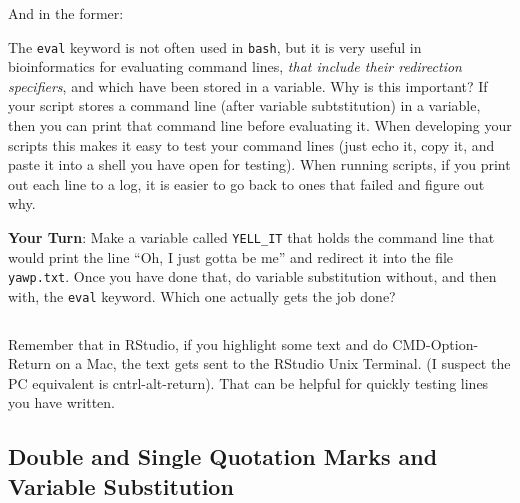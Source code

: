 \documentclass[]{krantz}
\makeatletter
\newenvironment{Shaded}{\begin{snugshade}}{\end{snugshade}}
\newcommand{\BuiltInTok}[1]{#1}
\newcommand{\CommentTok}[1]{\textcolor[rgb]{0.37,0.37,0.37}{\textit{#1}}}
\newcommand{\ExtensionTok}[1]{#1}
\newcommand{\NormalTok}[1]{#1}
\newcommand{\StringTok}[1]{\textcolor[rgb]{0.5,0.5,0.5}{#1}}
\newcommand{\VariableTok}[1]{\textcolor[rgb]{0,0,0}{#1}}
\newenvironment{kframe}{%
\medskip{}
\setlength{\fboxsep}{.8em}
 \def\at@end@of@kframe{}%
 \ifinner\ifhmode%
  \def\at@end@of@kframe{\end{minipage}}%
  \begin{minipage}{\columnwidth}%
 \fi\fi%
 \def\FrameCommand##1{\hskip\@totalleftmargin \hskip-\fboxsep
 \colorbox{shadecolor}{##1}\hskip-\fboxsep
     \hskip-\linewidth \hskip-\@totalleftmargin \hskip\columnwidth}%
 \MakeFramed {\advance\hsize-\width
   \@totalleftmargin\z@ \linewidth\hsize
   \@setminipage}}%
 {\par\unskip\endMakeFramed%
 \at@end@of@kframe}
\renewenvironment{Shaded}{\begin{kframe}}{\end{kframe}}
\let\BeginKnitrBlock\begin \let\EndKnitrBlock\end
\makeatother
\begin{document}
And in the former:

\begin{Shaded}
\end{Shaded}

\BeginKnitrBlock{rmdtip}
The \texttt{eval} keyword is not often used in \texttt{bash}, but it is very useful in bioinformatics
for evaluating command lines, \emph{that include their redirection specifiers}, and which have
been stored in a variable. Why is this important? If your script stores a command line (after
variable subtstitution) in a variable, then you can print that command line before evaluating
it. When developing your scripts this makes it easy to test your command lines (just echo it,
copy it, and paste it into a shell you have open for testing). When running scripts, if you print
out each line to a log, it is easier to go back to ones that failed and figure out why.
\EndKnitrBlock{rmdtip}

\textbf{Your Turn}: Make a variable called \texttt{YELL\_IT} that holds the command
line that would print the line ``Oh, I just gotta be me'' and redirect
it into the file \texttt{yawp.txt}. Once you have done that, do variable
substitution without, and then with, the \texttt{eval} keyword. Which one
actually gets the job done?

\begin{verbatim}
\end{verbatim}

Remember that in RStudio, if you highlight some text and do CMD-Option-Return on a Mac,
the text gets sent to the RStudio Unix Terminal. (I suspect the PC equivalent is
cntrl-alt-return). That can be helpful for quickly testing lines you have written.

\hypertarget{quotes-and-var-subs}{%
\subsection{Double and Single Quotation Marks and Variable Substitution}\label{quotes-and-var-subs}}
\end{document}

